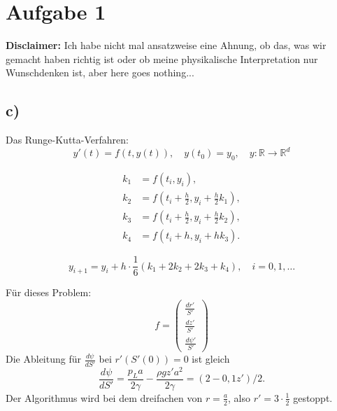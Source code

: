 \FloatBarrier
\section{Aufgabe 1}
\label{sec:A1}
\textbf{Disclaimer:} Ich habe nicht mal ansatzweise eine Ahnung,
ob das, was wir gemacht haben richtig ist oder ob meine physikalische Interpretation nur Wunschdenken ist,
aber here goes nothing...

\subsection*{c)}
Das Runge-Kutta-Verfahren:
\begin{equation*}
    \displaystyle y'(t)=f\left(t,y(t)\right),\quad y(t_{0})=y_{0},\quad y\colon \mathbb {R} \to \mathbb {R} ^{d}
\end{equation*}

\begin{equation*}
\displaystyle {\begin{aligned}k_{1}&=f(t_{i},y_{i}),\\
    k_{2}&=f(t_{i}+{\frac {h}{2}},y_{i}+{\frac {h}{2}}k_{1}),
    \\k_{3}&=f(t_{i}+{\frac {h}{2}},y_{i}+{\frac {h}{2}}k_{2}),
    \\k_{4}&=f(t_{i}+h,y_{i}+hk_{3}).\end{aligned}}
\end{equation*}

\begin{equation*}
\displaystyle y_{i+1}=y_{i}+h\cdot {\frac {1}{6}}\left(k_{1}+2k_{2}+2k_{3}+k_{4}\right),\quad i=0,1,\dots 
\end{equation*}

Für dieses Problem:
\begin{equation*}
     f = \begin{pmatrix}
        \frac{d r'}{S'} \\ 
        \frac{d z'}{S'} \\
        \frac{d \psi'}{S'} 
    \end{pmatrix}
\end{equation*}
Die Ableitung für $\frac{d \psi }{d S'}$ bei $r'(S'(0))=0$ ist gleich
\begin{equation*}
    \frac{d \psi }{d S'}= \frac{p_L a}{2 \gamma} - \frac{\rho g z' a^2}{2 \gamma} = (2-0,1 z') / 2.
\end{equation*}
Der Algorithmus wird bei dem dreifachen von $r=\tfrac{a}{2}$, also $r'= 3 \cdot \tfrac{1}{2}$ gestoppt.

